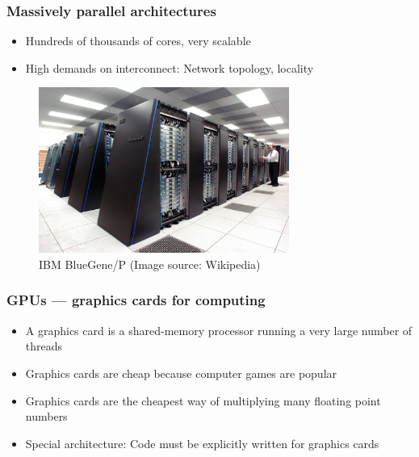 \documentclass[usenames,dvipsnames,mathserif,compress]{beamer}
\begin{document}
\begin{frame}
  \frametitle{Massively parallel architectures}
  \begin{itemize}
  \item Hundreds of thousands of cores, very scalable
  \item High demands on interconnect: Network topology, locality
  \end{itemize}
  \begin{figure}
    \includegraphics[width=0.73\textwidth]{IBM_Blue_Gene_P_supercomputer.jpg}
    \caption{IBM BlueGene/P (Image source: Wikipedia)}
  \end{figure}
\end{frame}


\begin{frame}
  \frametitle{GPUs --- graphics cards for computing}
  \begin{itemize}
  \item A graphics card is a shared-memory processor running a very large number of threads
  \item Graphics cards are cheap because computer games are popular
  \item Graphics cards are the cheapest way of multiplying many floating point numbers
  \item Special architecture: Code must be explicitly written for graphics cards
    \end{itemize}
\end{frame}
\end{document}
